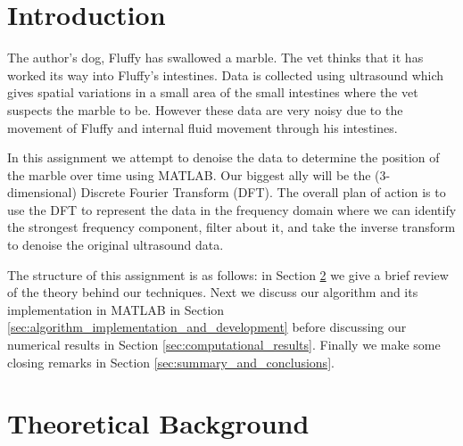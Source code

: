 \documentclass[fleqn,10pt]{SelfArx} %
\affiliation{\textsuperscript{1}\textit{Department of Applied Mathematics, University of Washington, Seattle}} %
\begin{document}
\flushbottom %

\maketitle %

\tableofcontents %



\section{Introduction}
\label{sec:introduction}
The author's dog, Fluffy has swallowed a marble. The vet thinks that it has worked its way into Fluffy's intestines. Data is collected using ultrasound which gives spatial variations in a small area of the small intestines where the vet suspects the marble to be. However these data are very noisy due to the movement of Fluffy and internal fluid movement through his intestines.

In this assignment we attempt to denoise the data to determine the position of the marble over time using MATLAB. Our biggest ally will be the (3-dimensional) Discrete Fourier Transform (DFT). The overall plan of action is to use the DFT to represent the data in the frequency domain where we can identify the strongest frequency component, filter about it, and take the inverse transform to denoise the original ultrasound data.

The structure of this assignment is as follows: in Section \ref{sec:theoretical_background} we give a brief review of the theory behind our techniques. Next we discuss our algorithm and its implementation in MATLAB in Section \ref{sec:algorithm_implementation_and_development} before discussing our numerical results in Section \ref{sec:computational_results}. Finally we make some closing remarks in Section \ref{sec:summary_and_conclusions}.


\section{Theoretical Background} %
\label{sec:theoretical_background}
\end{document}
